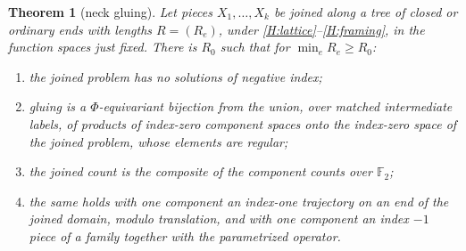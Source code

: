 \documentclass[11pt]{amsart}
\newtheorem{theorem}{Theorem}[section]
\theoremstyle{definition}
\theoremstyle{remark}
\theoremstyle{plain}
\numberwithin{equation}{section}
\newcommand{\FF}{\mathbb{F}_2}
\begin{document}
\begin{theorem}[neck gluing]\label{thm:neck}
Let pieces $X_1,\dots,X_k$ be joined along a tree of closed or ordinary
ends with lengths $R=(R_e)$, under
\ref{H:lattice}--\ref{H:framing}, in the function spaces just fixed. There
is $R_0$ such that for $\min_eR_e\ge R_0$:
\begin{enumerate}[label=(\roman*)]
\item the joined problem has no solutions of negative index;
\item gluing is a $\Phi$-equivariant bijection from the union, over
  matched intermediate labels, of products of index-zero component
  spaces onto the index-zero space of the joined problem, whose
  elements are regular;
\item the joined count is the composite of the component counts over
  $\FF$;
\item the same holds with one component an index-one trajectory on an end of the joined domain, modulo translation, and with one component an index $-1$ piece of a
  family together with the parametrized operator.
\end{enumerate}
\end{theorem}
\end{document}
